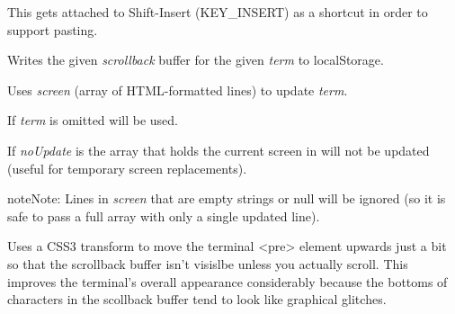 \documentclass[letterpaper,10pt,openany]{sphinxmanual}
\begin{document}

\begin{fulllineitems}
\label{Applications/terminal/js_terminal:GateOne.Terminal.paste}
This gets attached to Shift-Insert (KEY\_INSERT) as a shortcut in order to support pasting.

\end{fulllineitems}


\begin{fulllineitems}
\label{Applications/terminal/js_terminal:GateOne.Terminal.writeScrollback}
Writes the given \emph{scrollback} buffer for the given \emph{term} to localStorage.

\end{fulllineitems}


\begin{fulllineitems}
\label{Applications/terminal/js_terminal:GateOne.Terminal.applyScreen}
Uses \emph{screen} (array of HTML-formatted lines) to update \emph{term}.

If \emph{term} is omitted  will be used.

If \emph{noUpdate} is  the array that holds the current screen in  will not be updated (useful for temporary screen replacements).

\begin{notice}{note}{Note:}
Lines in \emph{screen} that are empty strings or null will be ignored (so it is safe to pass a full array with only a single updated line).
\end{notice}

\end{fulllineitems}


\begin{fulllineitems}
\label{Applications/terminal/js_terminal:GateOne.Terminal.alignTerminal}
Uses a CSS3 transform to move the terminal \textless{}pre\textgreater{} element upwards just a bit so that the scrollback buffer isn't visislbe unless you actually scroll.  This improves the terminal's overall appearance considerably because the bottoms of characters in the scollback buffer tend to look like graphical glitches.

\end{fulllineitems}
\end{document}
